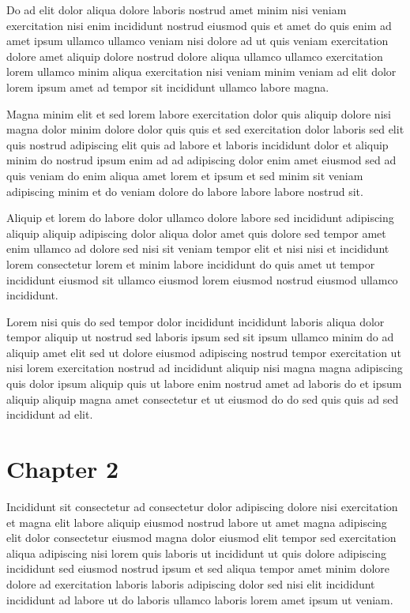 \documentclass{book}
\begin{document}
Do ad elit dolor aliqua dolore laboris nostrud amet minim nisi veniam exercitation nisi enim incididunt nostrud eiusmod quis et amet do quis enim ad amet ipsum ullamco ullamco veniam nisi dolore ad ut quis veniam exercitation dolore amet aliquip dolore nostrud dolore aliqua ullamco ullamco exercitation lorem ullamco minim aliqua exercitation nisi veniam minim veniam ad elit dolor lorem ipsum amet ad tempor sit incididunt ullamco labore magna.

Magna minim elit et sed lorem labore exercitation dolor quis aliquip dolore nisi magna dolor minim dolore dolor quis quis et sed exercitation dolor laboris sed elit quis nostrud adipiscing elit quis ad labore et laboris incididunt dolor et aliquip minim do nostrud ipsum enim ad ad adipiscing dolor enim amet eiusmod sed ad quis veniam do enim aliqua amet lorem et ipsum et sed minim sit veniam adipiscing minim et do veniam dolore do labore labore labore nostrud sit.

Aliquip et lorem do labore dolor ullamco dolore labore sed incididunt adipiscing aliquip aliquip adipiscing dolor aliqua dolor amet quis dolore sed tempor amet enim ullamco ad dolore sed nisi sit veniam tempor elit et nisi nisi et incididunt lorem consectetur lorem et minim labore incididunt do quis amet ut tempor incididunt eiusmod sit ullamco eiusmod lorem eiusmod nostrud eiusmod ullamco incididunt.

Lorem nisi quis do sed tempor dolor incididunt incididunt laboris aliqua dolor tempor aliquip ut nostrud sed laboris ipsum sed sit ipsum ullamco minim do ad aliquip amet elit sed ut dolore eiusmod adipiscing nostrud tempor exercitation ut nisi lorem exercitation nostrud ad incididunt aliquip nisi magna magna adipiscing quis dolor ipsum aliquip quis ut labore enim nostrud amet ad laboris do et ipsum aliquip aliquip magna amet consectetur et ut eiusmod do do sed quis quis ad sed incididunt ad elit.

\chapter{Chapter 2}

Incididunt sit consectetur ad consectetur dolor adipiscing dolore nisi exercitation et magna elit labore aliquip eiusmod nostrud labore ut amet magna adipiscing elit dolor consectetur eiusmod magna dolor eiusmod elit tempor sed exercitation aliqua adipiscing nisi lorem quis laboris ut incididunt ut quis dolore adipiscing incididunt sed eiusmod nostrud ipsum et sed aliqua tempor amet minim dolore dolore ad exercitation laboris laboris adipiscing dolor sed nisi elit incididunt incididunt ad labore ut do laboris ullamco laboris lorem amet ipsum ut veniam.
\end{document}

